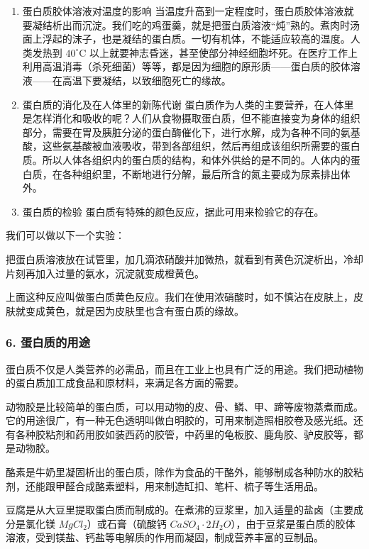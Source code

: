 \begin{enumerate}[start=3]
\item
  蛋白质胶体溶液对温度的影响
  当温度升高到一定程度时，蛋白质胶体溶液就要凝结析出而沉淀。我们吃的鸡蛋羹，就是把蛋白质溶液``炖''熟的。煮肉时汤面上浮起的沫子，也是凝结的蛋白质。一切有机体，不能适应较高的温度。人类发热到
  \(40^{\circ} \mathrm{C}\)
  以上就要神志昏迷，甚至使部分神经细胞坏死。在医疗工作上利用高温消毒（杀死细菌）等等，都是因为细胞的原形质------蛋白质的胶体溶液------在高温下要凝结，以致细胞死亡的缘故。
\item
  蛋白质的消化及在人体里的新陈代谢
  蛋白质作为人类的主要营养，在人体里是怎样消化和吸收的呢？人们从食物摄取蛋白质，但不能直接变为身体的组织部分，需要在胃及胰脏分泌的蛋白酶催化下，进行水解，成为各种不同的氨基酸，这些氨基酸被血液吸收，带到各部组织，然后再组成该组织所需要的蛋白质。所以人体各组织内的蛋白质的结构，和体外供给的是不同的。人体内的蛋白质，在各种组织里，不断地进行分解，最后所含的氮主要成为尿素排出体外。
\item
  蛋白质的检验 蛋白质有特殊的颜色反应，据此可用来检验它的存在。
\end{enumerate}

我们可以做以下一个实验：

把蛋白质溶液放在试管里，加几滴浓硝酸并加微热，就看到有黄色沉淀析出，冷却片刻再加入过量的氨水，沉淀就变成橙黄色。

上面这种反应叫做蛋白质黄色反应。我们在使用浓硝酸时，如不慎沾在皮肤上，皮肤就变成黄色，就是因为皮肤里也含有蛋白质的缘故。

\subsubsection{6. 蛋白质的用途}

蛋白质不仅是人类营养的必需品，而且在工业上也具有广泛的用途。我们把动植物的蛋白质加工成食品和原材料，来满足各方面的需要。

动物胶是比较简单的蛋白质，可以用动物的皮、骨、鳞、甲、蹄等废物蒸煮而成。它的用途很广，有一种无色透明叫做白明胶的，可用来制造照相胶卷及感光纸。还有各种胶粘剂和药用胶如装西药的胶管，中药里的龟板胶、鹿角胶、驴皮胶等，都是动物胶。

酪素是牛奶里凝固析出的蛋白质，除作为食品的干酪外，能够制成各种防水的胶粘剂，还能跟甲醛合成酪素塑料，用来制造缸扣、笔杆、梳子等生活用品。

豆腐是从大豆里提取蛋白质而制成的。在煮沸的豆浆里，加入适量的盐卤（主要成分是氯化镁
\(MgCl_{2}\)）或石膏（硫酸钙
\(CaSO_{4}\cdot2H_{2}O\)），由于豆浆是蛋白质的胶体溶液，受到镁盐、钙盐等电解质的作用而凝固，制成营养丰富的豆制品。

